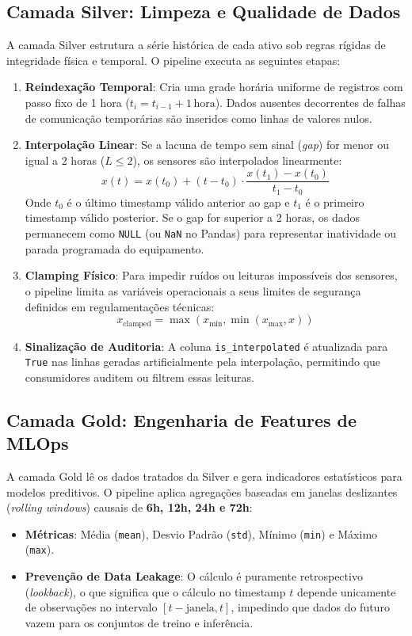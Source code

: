 \documentclass[12pt,a4paper]{article}
\begin{document}
\subsection{Camada Silver: Limpeza e Qualidade de Dados}
A camada Silver estrutura a série histórica de cada ativo sob regras rígidas de integridade física e temporal. O pipeline executa as seguintes etapas:
\begin{enumerate}
    \item \textbf{Reindexação Temporal}: Cria uma grade horária uniforme de registros com passo fixo de 1 hora ($t_{i} = t_{i-1} + 1\,\text{hora}$). Dados ausentes decorrentes de falhas de comunicação temporárias são inseridos como linhas de valores nulos.
    \item \textbf{Interpolação Linear}: Se a lacuna de tempo sem sinal (\textit{gap}) for menor ou igual a 2 horas ($L \le 2$), os sensores são interpolados linearmente:
    \begin{equation}
        x(t) = x(t_{0}) + (t - t_{0}) \cdot \frac{x(t_{1}) - x(t_{0})}{t_{1} - t_{0}}
    \end{equation}
    Onde $t_0$ é o último timestamp válido anterior ao gap e $t_1$ é o primeiro timestamp válido posterior. Se o gap for superior a 2 horas, os dados permanecem como \texttt{NULL} (ou \texttt{NaN} no Pandas) para representar inatividade ou parada programada do equipamento.
    \item \textbf{Clamping Físico}: Para impedir ruídos ou leituras impossíveis dos sensores, o pipeline limita as variáveis operacionais a seus limites de segurança definidos em regulamentações técnicas:
    \begin{equation}
        x_{\text{clamped}} = \max(x_{\text{min}}, \min(x_{\text{max}}, x))
    \end{equation}
    \item \textbf{Sinalização de Auditoria}: A coluna \texttt{is\_interpolated} é atualizada para \texttt{True} nas linhas geradas artificialmente pela interpolação, permitindo que consumidores auditem ou filtrem essas leituras.
\end{enumerate}

\subsection{Camada Gold: Engenharia de Features de MLOps}
A camada Gold lê os dados tratados da Silver e gera indicadores estatísticos para modelos preditivos. O pipeline aplica agregações baseadas em janelas deslizantes (\textit{rolling windows}) causais de \textbf{6h, 12h, 24h e 72h}:
\begin{itemize}
    \item \textbf{Métricas}: Média (\texttt{mean}), Desvio Padrão (\texttt{std}), Mínimo (\texttt{min}) e Máximo (\texttt{max}).
    \item \textbf{Prevenção de Data Leakage}: O cálculo é puramente retrospectivo (\textit{lookback}), o que significa que o cálculo no timestamp $t$ depende unicamente de observações no intervalo $[t - \text{janela}, t]$, impedindo que dados do futuro vazem para os conjuntos de treino e inferência.
\end{itemize}
\end{document}
